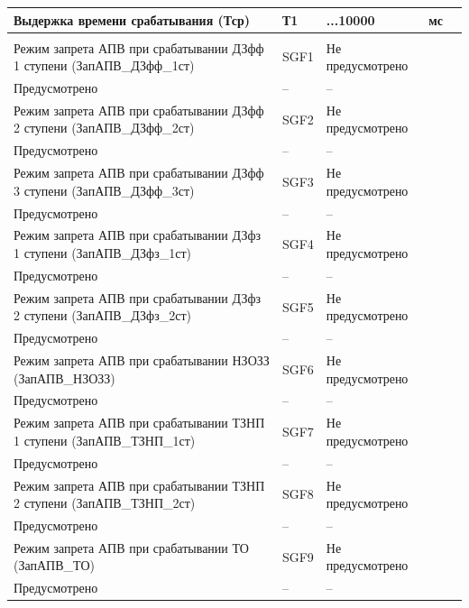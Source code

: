 \begin{longtable}{|>{\centering\arraybackslash}m{5.3cm}|>{\centering\arraybackslash}m{3.3cm}|>{\centering\arraybackslash}m{4.2cm}|>{\centering\arraybackslash}m{1.8cm}|>{\centering\arraybackslash}m{1cm}|}
\hline
\centering Выдержка времени срабатывания (Тср)  & \centering Т1 & \centering 0...10000 & \centering мс & \centering \arraybackslash 10 \\
\hline
\multicolumn{5}{|c|}{ ЗАПВ } \\ \hline 
\centering Режим запрета АПВ при срабатывании ДЗфф 1 ступени (ЗапАПВ\_ДЗфф\_1ст)  & \centering SGF1 & \centering Не предусмотрено \\ Предусмотрено & \centering -- & \centering \arraybackslash -- \\
\hline
\centering Режим запрета АПВ при срабатывании ДЗфф 2 ступени (ЗапАПВ\_ДЗфф\_2ст)  & \centering SGF2 & \centering Не предусмотрено \\ Предусмотрено & \centering -- & \centering \arraybackslash -- \\
\hline
\centering Режим запрета АПВ при срабатывании ДЗфф 3 ступени (ЗапАПВ\_ДЗфф\_3ст)  & \centering SGF3 & \centering Не предусмотрено \\ Предусмотрено & \centering -- & \centering \arraybackslash -- \\
\hline
\centering Режим запрета АПВ при срабатывании ДЗфз 1 ступени (ЗапАПВ\_ДЗфз\_1ст)  & \centering SGF4 & \centering Не предусмотрено \\ Предусмотрено & \centering -- & \centering \arraybackslash -- \\
\hline
\centering Режим запрета АПВ при срабатывании ДЗфз 2 ступени (ЗапАПВ\_ДЗфз\_2ст)  & \centering SGF5 & \centering Не предусмотрено \\ Предусмотрено & \centering -- & \centering \arraybackslash -- \\
\hline
\centering Режим запрета АПВ при срабатывании НЗОЗЗ (ЗапАПВ\_НЗОЗЗ)  & \centering SGF6 & \centering Не предусмотрено \\ Предусмотрено & \centering -- & \centering \arraybackslash -- \\
\hline
\centering Режим запрета АПВ при срабатывании ТЗНП 1 ступени (ЗапАПВ\_ТЗНП\_1ст)  & \centering SGF7 & \centering Не предусмотрено \\ Предусмотрено & \centering -- & \centering \arraybackslash -- \\
\hline
\centering Режим запрета АПВ при срабатывании ТЗНП 2 ступени (ЗапАПВ\_ТЗНП\_2ст)  & \centering SGF8 & \centering Не предусмотрено \\ Предусмотрено & \centering -- & \centering \arraybackslash -- \\
\hline
\centering Режим запрета АПВ при срабатывании ТО (ЗапАПВ\_ТО)  & \centering SGF9 & \centering Не предусмотрено \\ Предусмотрено & \centering -- & \centering \arraybackslash -- \\

\end{longtable}
